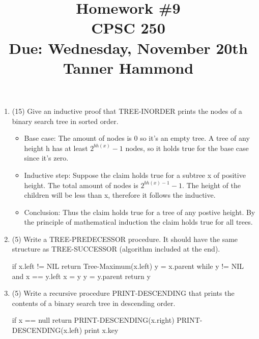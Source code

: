\documentclass[12pt]{article}
\begin{document}

\title{Homework \#9 \\ CPSC 250 \\ Due: Wednesday, November 20th \\ Tanner Hammond}%
\date{}

\maketitle

\begin{enumerate}

\item (15) Give an inductive proof that TREE-INORDER prints the nodes of a binary search tree in 
sorted order.
\begin{itemize}
\item Base case: The amount of nodes is 0 so it's an empty tree. A tree of any height h has at least $2^{bh(x)} -1$ nodes, so it holds true for the base case since it's zero.
\item Inductive step: Suppose the claim holds true for a subtree x of positive height. The total amount of nodes is $2^{bh(x)-1} -1$. The height of the children will be less than x, therefore it follows the inductive. 
\item Conclusion: Thus the claim holds true for a tree of any postive height. By the principle of mathematical induction the claim holds true for all trees.
\end{itemize}

\item (5) Write a TREE-PREDECESSOR procedure. It should have the same structure as
 TREE-SUCCESSOR (algorithm included at the end).
\begin{algorithm}[H]
 \begin{algorithmic}[1]
 \State if x.left != NIL
\State \indent  return Tree-Maximum(x.left)
\State y = x.parent
\State while y != NIL and x == y.left
\State \indent x = y
\State \indent y = y.parent
\State return y
 
 \EndProcedure
\end{algorithmic}
\end{algorithm}

\item (5) Write a recursive procedure PRINT-DESCENDING that prints the contents of a binary 
search tree in descending order.
\begin{algorithm}[H]
 \begin{algorithmic}[1]
 \State if x == null
 \State \indent return 
 \State PRINT-DESCENDING(x.right)
 \State PRINT-DESCENDING(x.left)
 \State print x.key
 \EndProcedure
\end{algorithmic}
\end{algorithm}


\end{enumerate}
\end{document}
